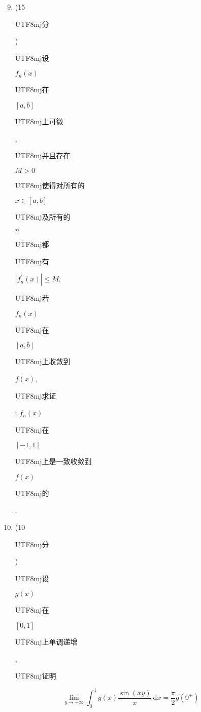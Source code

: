 \documentclass[10pt]{article}
\begin{document}
\begin{enumerate}
  \setcounter{enumi}{8}
  \item (15 \begin{CJK}{UTF8}{mj}分\end{CJK}) \begin{CJK}{UTF8}{mj}设\end{CJK} $f_{n}(x)$ \begin{CJK}{UTF8}{mj}在\end{CJK} $[a, b]$ \begin{CJK}{UTF8}{mj}上可微\end{CJK}, \begin{CJK}{UTF8}{mj}并且存在\end{CJK} $M>0$ \begin{CJK}{UTF8}{mj}使得对所有的\end{CJK} $x \in[a, b]$ \begin{CJK}{UTF8}{mj}及所有的\end{CJK} $n$ \begin{CJK}{UTF8}{mj}都\end{CJK} \begin{CJK}{UTF8}{mj}有\end{CJK} $\left|f_{n}^{\prime}(x)\right| \leq M$. \begin{CJK}{UTF8}{mj}若\end{CJK} $f_{n}(x)$ \begin{CJK}{UTF8}{mj}在\end{CJK} $[a, b]$ \begin{CJK}{UTF8}{mj}上收敛到\end{CJK} $f(x)$, \begin{CJK}{UTF8}{mj}求证\end{CJK}: $f_{n}(x)$ \begin{CJK}{UTF8}{mj}在\end{CJK} $[-1,1]$ \begin{CJK}{UTF8}{mj}上是一致收敛到\end{CJK} $f(x)$ \begin{CJK}{UTF8}{mj}的\end{CJK}.

  \item (10 \begin{CJK}{UTF8}{mj}分\end{CJK}) \begin{CJK}{UTF8}{mj}设\end{CJK} $g(x)$ \begin{CJK}{UTF8}{mj}在\end{CJK} $[0,1]$ \begin{CJK}{UTF8}{mj}上单调递增\end{CJK}, \begin{CJK}{UTF8}{mj}证明\end{CJK}

\end{enumerate}
$$
\lim _{y \rightarrow+\infty} \int_{0}^{1} g(x) \frac{\sin (x y)}{x} \mathrm{~d} x=\frac{\pi}{2} g\left(0^{+}\right)
$$
\end{document}
